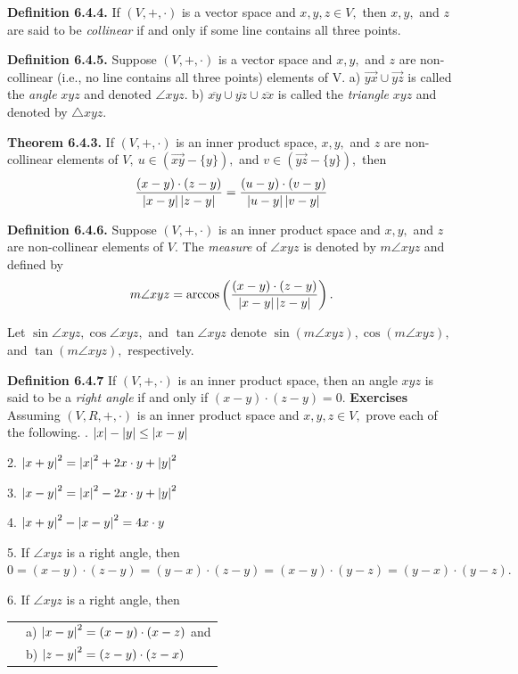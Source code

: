 \textbf{Definition 6.4.4.} If $(V,+,\cdot)$ is a vector space and $x,y,z\in V,$ then $x,y,$ and $z$ are said to be \textit{collinear} if and only if some line contains all three points.\nl

\textbf{Definition 6.4.5.} Suppose $(V, +, \cdot)$ is a vector space and $x,y,$ and $z$
are non-collinear (i.e., no line contains all three points) elements of V.\nl
a) $\overrightarrow{yx} \cup \overrightarrow{yz}$ is called the \textit{angle} $xyz$ and denoted $\angle xyz.$\nl
b) $\overline{xy}\cup \overline{yz} \cup \overline{zx}$ is called the \textit{triangle} $xyz$ and denoted by
$\triangle xyz$.

\newpage

\textbf{Theorem 6.4.3.} If $(V,+,\cdot)$ is an inner product space, $x,y,$ and $z$ are non-collinear elements of $V,~ u\in(\overrightarrow{xy} - \{y\}),$ and $v\in(\overrightarrow{yz} - \{y\}),$ then\nl
\[
\dfrac{(x - y)\cdot(z - y)}{\left|x - y\right|\left|z - y\right|} =  \dfrac{(u - y)\cdot(v - y)}{\left|u - y\right|\left|v - y\right|}
\]

\textbf{Definition 6.4.6.} Suppose $(V,+,\cdot)$ is an inner product space and $x,y,$ and $z$ are non-collinear elements of $V.$ The \textit{measure} of $\angle xyz$  is denoted by $m\angle xyz$ and defined by
\[
m\angle xyz = \arccos \left(  \dfrac{(x - y)\cdot(z - y)}{\left|x - y\right|\left|z - y\right|}  \right).
\]

Let $\sin \angle xyz, \cos \angle xyz,$ and $\tan\angle xyz$ denote $\sin(m\angle xyz), \cos(m\angle xyz),$ and $\tan (m\angle xyz),$ respectively. \nl

\textbf{Definition 6.4.7} If $(V,+,\cdot)$ is an inner product space, then an angle $xyz$ is said to be a \textit{right angle} if and only if $(x - y)\cdot(z - y) = 0.$\nl
\textbf{Exercises}\nl
Assuming $(V,R,+,\cdot)$ is an inner product space and $x,y,z\in V,$ prove each of the following. . $\left|x\right| - \left|y\right| \leq \left|x - y\right|$\nl

2. $\left|x + y\right|^{2} = \left|x\right|^{2} + 2x\cdot y + \left|y\right|^{2}     $ \nl

3. $\left|x - y\right|^{2} = \left|x\right|^{2} - 2x\cdot y + \left|y\right|^{2}$\nl

4. $\left|x + y\right|^{2} - \left|x - y\right|^{2} = 4x\cdot y$\nl

5. If $\angle xyz$ is a right angle, then $0 =(x - y)\cdot(z - y) = (y - x)\cdot(z - y) =(x - y)\cdot(y - z) = (y - x)\cdot(y - z).$\nl

6. 	If $\angle xyz$ is a right angle, then\nl
\begin{tabular}{r l}
&a) $\left|x - y\right|^{2} = (x - y)\cdot (x - z)$ and \\
&b) $\left|z - y\right|^{2} = (z - y)\cdot(z - x)$\\
\end{tabular}\nl

